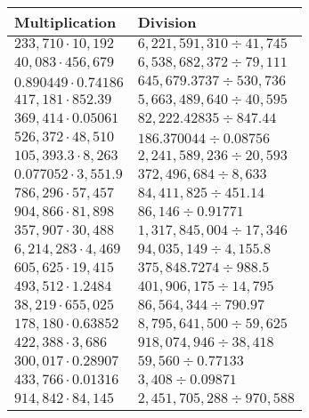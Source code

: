 \begin{longtable}[]{@{}ll@{}}
\toprule
Multiplication & Division\tabularnewline
\midrule
\endhead
\(233,710\cdot10,192\) & \(6,221,591,310÷41,745\)\tabularnewline
\(40,083\cdot456,679\) & \(6,538,682,372÷79,111\)\tabularnewline
\(0.890449\cdot0.74186\) & \(645,679.3737÷530,736\)\tabularnewline
\(417,181\cdot852.39\) & \(5,663,489,640÷40,595\)\tabularnewline
\(369,414\cdot0.05061\) & \(82,222.42835÷847.44\)\tabularnewline
\(526,372\cdot48,510\) & \(186.370044÷0.08756\)\tabularnewline
\(105,393.3\cdot8,263\) & \(2,241,589,236÷20,593\)\tabularnewline
\(0.077052\cdot3,551.9\) & \(372,496,684÷8,633\)\tabularnewline
\(786,296\cdot57,457\) & \(84,411,825÷451.14\)\tabularnewline
\(904,866\cdot81,898\) & \(86,146÷0.91771\)\tabularnewline
\(357,907\cdot30,488\) & \(1,317,845,004÷17,346\)\tabularnewline
\(6,214,283\cdot4,469\) & \(94,035,149÷4,155.8\)\tabularnewline
\(605,625\cdot19,415\) & \(375,848.7274÷988.5\)\tabularnewline
\(493,512\cdot1.2484\) & \(401,906,175÷14,795\)\tabularnewline
\(38,219\cdot655,025\) & \(86,564,344÷790.97\)\tabularnewline
\(178,180\cdot0.63852\) & \(8,795,641,500÷59,625\)\tabularnewline
\(422,388\cdot3,686\) & \(918,074,946÷38,418\)\tabularnewline
\(300,017\cdot0.28907\) & \(59,560÷0.77133\)\tabularnewline
\(433,766\cdot0.01316\) & \(3,408÷0.09871\)\tabularnewline
\(914,842\cdot84,145\) & \(2,451,705,288÷970,588\)\tabularnewline
\bottomrule
\end{longtable}
